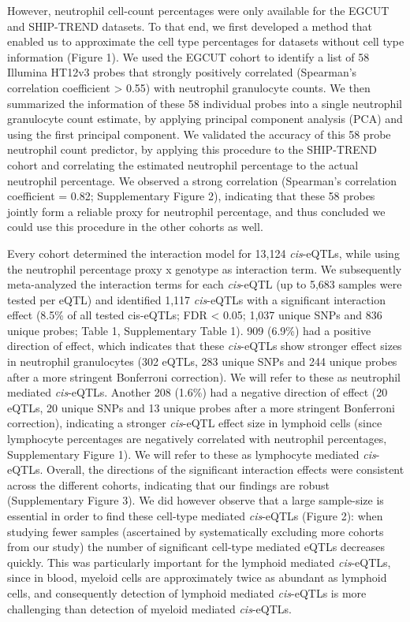   However, neutrophil cell-count percentages were only available for the EGCUT and SHIP-TREND datasets. 
  To that end, we first developed a method that enabled us to approximate the cell type percentages for 
  datasets without cell type information (Figure 1). We used the EGCUT cohort to identify a list of 58 
  Illumina HT12v3 probes that strongly positively correlated (Spearman's correlation coefficient > 0.55) 
  with neutrophil granulocyte counts. We then summarized the information of these 58 individual probes 
  into a single neutrophil granulocyte count estimate, by applying principal component analysis (PCA) 
  and using the first principal component. We validated the accuracy of this 58 probe neutrophil count 
  predictor, by applying this procedure to the SHIP-TREND cohort and correlating the estimated neutrophil 
  percentage to the actual neutrophil percentage. We observed a strong correlation (Spearman's correlation 
  coefficient = 0.82; Supplementary Figure 2), indicating that these 58 probes jointly form a reliable 
  proxy for neutrophil percentage, and thus concluded we could use this procedure in the other cohorts 
  as well.

  Every cohort determined the interaction model for 13,124 \emph{cis}-eQTLs, while using the neutrophil 
  percentage proxy x genotype as interaction term. We subsequently meta-analyzed the interaction 
  terms for each \emph{cis}-eQTL (up to 5,683 samples were tested per eQTL) and identified 1,117 \emph{cis}-eQTLs 
  with a significant interaction effect (8.5\% of all tested cis-eQTLs; FDR < 0.05; 1,037 unique SNPs 
  and 836 unique probes; Table 1, Supplementary Table 1). 909 (6.9\%) had a positive direction of 
  effect, which indicates that these \emph{cis}-eQTLs show stronger effect sizes in neutrophil granulocytes 
  (302 eQTLs, 283 unique SNPs and 244 unique probes after a more stringent Bonferroni correction). We 
  will refer to these as neutrophil mediated \emph{cis}-eQTLs. Another 208 (1.6\%) had a negative direction of 
  effect (20 eQTLs, 20 unique SNPs and 13 unique probes after a more stringent Bonferroni correction), 
  indicating a stronger \emph{cis}-eQTL effect size in lymphoid cells (since lymphocyte percentages are 
  negatively correlated with neutrophil percentages, Supplementary Figure 1). We will refer to these 
  as lymphocyte mediated \emph{cis}-eQTLs. Overall, the directions of the significant interaction effects were 
  consistent across the different cohorts, indicating that our findings are robust (Supplementary 
  Figure 3). We did however observe that a large sample-size is essential in order to find these 
  cell-type mediated \emph{cis}-eQTLs (Figure 2): when studying fewer samples (ascertained by systematically 
  excluding more cohorts from our study) the number of significant cell-type mediated eQTLs decreases 
  quickly. This was particularly important for the lymphoid mediated \emph{cis}-eQTLs, since in blood, 
  myeloid cells are approximately twice as abundant as lymphoid cells, and consequently detection of 
  lymphoid mediated \emph{cis}-eQTLs is more challenging than detection of myeloid mediated \emph{cis}-eQTLs.

